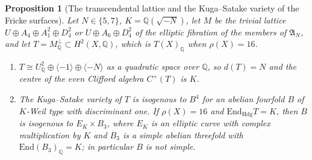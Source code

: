 \documentclass[11pt,reqno]{amsart}
\numberwithin{equation}{section}
\theoremstyle{plain}
\newtheorem{proposition}[theorem]{Proposition}
\theoremstyle{definition}
\newcommand{\QQ}{\mathbb{Q}}
\newcommand{\Hdg}{\mathrm{Hdg}}
\newcommand{\End}{\mathrm{End}}
\begin{document}
\begin{proposition}[The transcendental lattice and the Kuga--Satake variety of the Fricke surfaces]\label{prop:frickeks}
Let $N\in\{5,7\}$, $K=\QQ(\sqrt{-N})$, let $M$ be the trivial lattice $U\oplus A_{4}\oplus A_{1}^{2}\oplus D_{4}^{2}$ or $U\oplus A_{6}\oplus D_{4}^{2}$ of the elliptic fibration of the members of $\mathfrak{A}_{N}$, and let $T=M^{\perp}_{\QQ}\subset H^{2}(X,\QQ)$, which is $T(X)_{\QQ}$ when $\rho(X)=16$.
\begin{enumerate}[label=\textup{(\roman*)},leftmargin=2.4em,itemsep=2pt]
\item $T\cong U_{\QQ}^{2}\oplus\langle-1\rangle\oplus\langle-N\rangle$ as a quadratic space over $\QQ$, so $d(T)=N$ and the centre of the even Clifford algebra $C^{+}(T)$ is $K$.
\item The Kuga--Satake variety of $T$ is isogenous to $B^{4}$ for an abelian fourfold $B$ of $K$-Weil type with discriminant one. If $\rho(X)=16$ and $\End_{\Hdg}T=K$, then $B$ is isogenous to $E_{K}\times B_{3}$, where $E_{K}$ is an elliptic curve with complex multiplication by $K$ and $B_{3}$ is a simple abelian threefold with $\End(B_{3})_{\QQ}=K$; in particular $B$ is not simple.
\end{enumerate}
\end{proposition}
\end{document}
